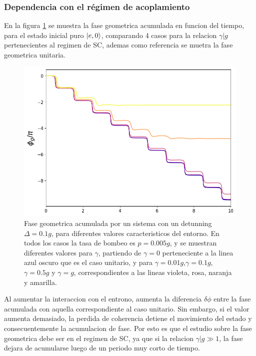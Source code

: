 \subsubsection{Dependencia con el régimen de acoplamiento}
En la figura \ref{fig3:fg gamma} se muestra la fase geometrica acumulada en funcion del tiempo, para el estado inicial puro $\ket{e,0}$, comparando 4 casos para la relacion $\gamma|g$ pertenecientes al regimen de SC, ademas como referencia se muetra la fase geometrica unitaria.
\begin{figure}[H]
    \begin{minipage}[c]{0.67\textwidth}
        \includegraphics[width=\textwidth]{figuras/ch3/fg gamma.png}
      \end{minipage}\hfill
      \begin{minipage}[c]{0.3\textwidth}
        \caption{
            Fase geometrica acumulada por un sistema con un detunning $\Delta=0.1g$, para diferentes valores caracteristicos del entorno. En todos los casos la tasa de bombeo es $p=0.005g$, y se muestran diferentes valores para $\gamma$, partiendo de $\gamma=0$ perteneciente a la linea azul oscuro que es el caso unitario, y para $\gamma=0.01g$,$\gamma=0.1g$,$\gamma=0.5g$ y $\gamma=g$, correspondientes a las lineas violeta, rosa, naranja y amarilla.
        } \label{fig3:fg gamma}
      \end{minipage}
\end{figure}
Al aumentar la interaccion con el entrono, aumenta la diferencia $\delta \phi$ entre la fase acumulada con aquella correspondiente al caso unitario. Sin embargo, si el valor aumenta demasiado, la perdida de coherencia detiene el movimiento del estado y consecuentemente la acumulacion de fase. Por esto es que el estudio sobre la fase geometrica debe ser en el regimen de SC, ya que si la relacion $\gamma|g\gg 1$, la fase dejara de acumularse luego de un periodo muy corto de tiempo.


